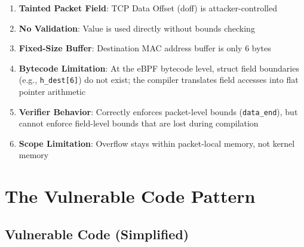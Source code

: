 \begin{enumerate}[label=\arabic*.]
  \item \textbf{Tainted Packet Field}: TCP Data Offset (doff) is attacker-controlled
  \item \textbf{No Validation}: Value is used directly without bounds checking
  \item \textbf{Fixed-Size Buffer}: Destination MAC address buffer is only 6 bytes
  \item \textbf{Bytecode Limitation}: At the eBPF bytecode level, struct field boundaries (e.g., \texttt{h\_dest[6]}) do not exist; the compiler translates field accesses into flat pointer arithmetic
  \item \textbf{Verifier Behavior}: Correctly enforces packet-level bounds (\texttt{data\_end}), but cannot enforce field-level bounds that are lost during compilation
  \item \textbf{Scope Limitation}: Overflow stays within packet-local memory, not kernel memory
\end{enumerate}

\section{The Vulnerable Code Pattern}

\subsection{Vulnerable Code (Simplified)}

\vspace{0.3cm}
\noindent
{}
\vspace{0.3cm}


